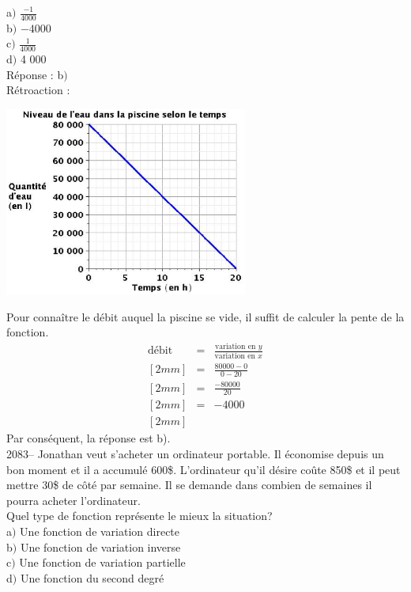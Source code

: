 \documentclass[letterpaper, 12pt]{article}
\begin{document}
a$)$ $\frac{-1}{4 000}$\\[2mm]
b$)$ $-4 000$\\ [2mm]
c$)$ $\frac{1}{4 000}$\\[2mm]
d$)$ 4 000\\

R\'eponse : b$)$\\

R\'etroaction :\\
\begin{center}
 \includegraphics[width=8cm,bb=14 14 529 415]{Q2082v.eps}
\end{center}
Pour conna\^itre le d\'ebit auquel la piscine se vide, il suffit de calculer la pente de la fonction.\\
\begin{eqnarray*}
\textrm{d\'ebit} &=& \frac{\textrm{variation en $y$}}{\textrm{variation en $x$}} \\ [2mm]
&=& \frac{80 000-0}{0-20}\\ [2mm]
&=& \frac{-80 000}{20}\\ [2mm]
&=& -4 000\\ [2mm]
\end{eqnarray*}
Par cons\'equent, la r\'eponse est b).\\

2083-- Jonathan veut s'acheter un ordinateur portable. Il \'economise depuis un bon moment et il a accumul\'e 600\$. L'ordinateur qu'il d\'esire co\^ute 850\$ et il peut mettre 30\$ de c\^ot\'e par semaine. Il se demande dans combien de semaines il pourra acheter l'ordinateur.\\
Quel type de fonction repr\'esente le mieux la situation?\\

a$)$ Une fonction de variation directe\\
b$)$ Une fonction de variation inverse\\
c$)$ Une fonction de variation partielle\\
d$)$ Une fonction du second degr\'e\\
\end{document}
